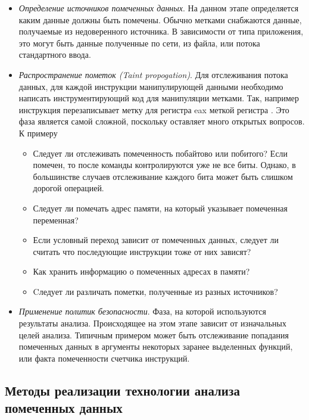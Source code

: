 \begin{itemize}
    \begin{itemize}
        \item {\em Определение источников помеченных данных}. На данном этапе определяется каким данные должны быть помечены. Обычно метками снабжаются данные, получаемые из недоверенного
        источника. В зависимости от типа приложения, это могут быть данные полученные по сети, из файла, или потока стандартного ввода.
        \item {\em Распространение пометок (Taint propogation)}. Для отслеживания потока данных, 
        для каждой инструкции манипулирующей данными необходимо написать инструментирующий код для манипуляции метками. Так, например инструкция  перезаписывает метку для регистра eax меткой регистра . Это фаза является самой сложной, поскольку оставляет много открытых вопросов. К примеру
        \begin{itemize}
            \item Следует ли отслеживать помеченность побайтово или побитого? Если  помечен, то после команды  контролируются уже не все биты. Однако, в большинстве случаев отслеживание каждого бита может быть слишком дорогой операцией.
            \item Следует ли помечать адрес памяти, на который указывает помеченная переменная?
            \item Если условный переход зависит от помеченных данных, следует ли считать что последующие инструкции тоже от них зависят?
            \item Как хранить информацию о помеченных адресах в памяти?
            \item Cледует ли различать пометки, полученные из разных источников?
        \end{itemize}
        \item {\em Применение политик безопасности}. Фаза, на которой используются результаты анализа. Происходящее на этом этапе зависит от изначальных целей анализа. Типичным примером может быть отслеживание попадания помеченных данных в аргументы некоторых заранее выделенных функций, или факта помеченности счетчика инструкций.
    \end{itemize}


\subsection{Методы реализации технологии анализа помеченных данных}


\end{itemize}
